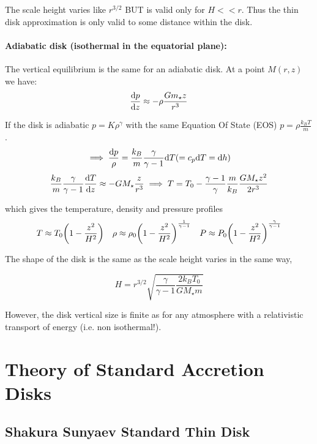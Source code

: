 \documentclass[10pt,a4paper,english]{article}
\let\originalleft\left
\let\originalright\right
\renewcommand{\left}{\mathopen{}\mathclose\bgroup\originalleft}
\renewcommand{\right}{\aftergroup\egroup\originalright}
\begin{document}
The scale height varies like $r^{3/2}$ BUT is valid only for $H<<r$. Thus the thin disk approximation is only valid to some distance within the disk.


\paragraph{Adiabatic disk (isothermal in the equatorial plane):} The vertical equilibrium is the same for an adiabatic disk. At a point $M(r,z)$ we have:
\begin{equation}
\frac{\mathrm{d} p}{\mathrm{d} z} \approx -\rho\frac{G m_\star z}{r^3}
\end{equation}

If the disk is adiabatic $p=K \rho^\gamma$ with the same Equation Of State (EOS) $p=\rho \frac{k_B T}{m}$.
\begin{equation}
\implies \frac{\mathrm{d} p}{\rho} = \frac{k_B}{m}\frac{\gamma}{\gamma - 1}\mathrm{d} T (=c_p \mathrm{d} T = \mathrm{d} h)
\end{equation}
\begin{equation}
\frac{k_B}{m}\frac{\gamma}{\gamma - 1}\frac{\mathrm{d} T }{\mathrm{d} z} \approx -G M_\star \frac{z}{r^3} \implies T = T_0 - \frac{\gamma - 1}{\gamma}\frac{m}{k_B}\frac{G M_\star z^2}{2r^3}
\end{equation}

which gives the temperature, density and pressure profiles
\begin{equation}
T \approx T_0\left( 1-\frac{z^2}{H^2} \right) \quad \rho \approx \rho_0\left( 1-\frac{z^2}{H^2} \right)^{\frac{1}{\gamma - 1}} \quad P \approx P_0\left( 1-\frac{z^2}{H^2} \right)^{\frac{\gamma}{\gamma - 1}}
\end{equation}

The shape of the disk is the same as the scale height varies in the same way,

\begin{equation}
H = r^{3/2} \sqrt{\frac{\gamma}{\gamma-1}\frac{2 k_B T_0}{G M_\star m}}
\end{equation}

However, the disk vertical size is finite as for any atmosphere with a relativistic transport of energy (i.e. non isothermal!).

\section{Theory of Standard Accretion Disks}

\subsection{Shakura Sunyaev Standard Thin Disk}
\end{document}
